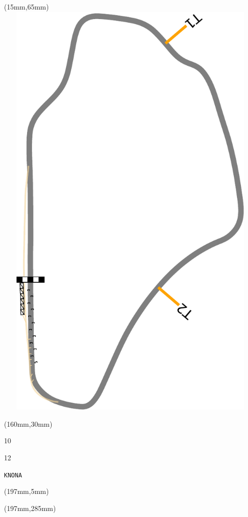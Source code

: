 \begin{textblock*}{185mm}(15mm,65mm)%
\centering
\mbox{\includegraphics[width=185mm,height=210mm,keepaspectratio]{PT/KNONA.pdf}}
\end{textblock*}
\begin{textblock*}{40mm}(160mm,30mm)%
\Large
\par{} 
\par10 
\par12 
\par\hfill\tiny\tt KNONA\\
\end{textblock*}
\begin{textblock*}{20mm}(197mm,5mm)%
\fbox{\thepage}
\label{KNONA}
\end{textblock*}
\begin{textblock*}{20mm}(197mm,285mm)%
\fbox{\thepage}
\end{textblock*}

